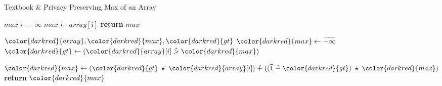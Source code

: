 \begin{algorithm}[H]
\caption{Textbook \& Privacy Preserving Max of an Array}\label{a:max}
\begin{algorithmic}[1]
\renewcommand{\algorithmicrequire}{\textbf{Private Vars:}}

    \State $max  \gets -\infty$
            \State $max \gets array[i]$
        \EndIf
    \EndFor
    \State \textbf{return} {$max$}
\EndProcedure

\begin{spacing}{0.5}
\end{spacing}

\Require ${\color{darkred}{array}}, {\color{darkred}{max}}, {\color{darkred}{gt}}$
    \State ${\color{darkred}{max}} \gets \enc{-\infty}$
        \State ${\color{darkred}{gt}} \gets ({\color{darkred}{array}}[i] \hgt {\color{darkred}{max}})$
        
        \State ${\color{darkred}{max}} \gets ({\color{darkred}{gt}} \hmul {\color{darkred}{array}}[i]) \hplus ((\enc{1} \hminus {\color{darkred}{gt}}) \hmul {\color{darkred}{max}})$
    \EndFor
    \State \textbf{return} {${\color{darkred}{max}}$}
\EndProcedure

\end{algorithmic}
\end{algorithm}
